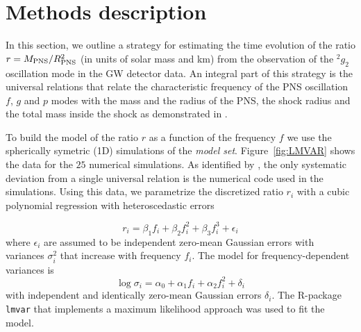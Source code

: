 \section{Methods description}
\label{methods}

In this section, we outline a strategy for estimating the time evolution of the
ratio $r=M_{\rm PNS}/R_{\rm PNS}^2$ (in units of solar mass and km) from the observation of the $\mbox{}^2g_2$
oscillation mode in the GW detector data.
An integral part of this strategy is the universal relations that relate the
characteristic frequency of the PNS oscillation $f$, $g$ and $p$ modes with the mass
and the radius of the PNS, the shock radius and the total mass inside the shock as
demonstrated in \cite{Torres:2019b}.

To build the model of the ratio $r$ as a function of the frequency $f$ we use the 
spherically symetric (1D) simulations of the {\it model set}. Figure~\ref{fig:LMVAR}
shows the data for the $25$ numerical simulations. As identified by \cite{Torres:2019b}, the only systematic
deviation from a single universal relation is the numerical code used in the simulations. 
Using this data, we parametrize the discretized ratio $r_i$ with a cubic polynomial
regression with heteroscedastic errors

\begin{equation}
\label{eq:model1}
r_i=\beta_1 f_i + \beta_2 f_i^2 +\beta_3 f_i^3 + \epsilon_i
\end{equation}
where $\epsilon_i$ are assumed to be independent zero-mean Gaussian errors with
variances $\sigma_i^2$ that increase with frequency $f_i$. The model for frequency-dependent
variances is
\begin{equation}
\log \sigma_i=\alpha_0+ \alpha_1 f_i + \alpha_2 f_i^2 + \delta_i
\end{equation}
with independent and identically zero-mean Gaussian errors $\delta_i$. The R-package \texttt{lmvar}
\cite{lmvar:2019} that implements a maximum likelihood approach was used to fit the model.

